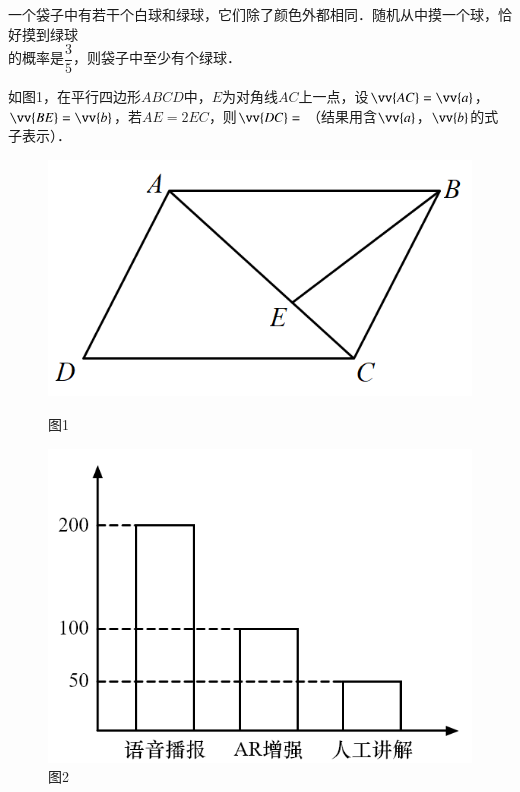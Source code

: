 \documentclass{article}
\begin{document}
\begin{question}[14]
    \item 一个袋子中有若干个白球和绿球，它们除了颜色外都相同．随机从中摸一个球，恰好摸到绿球 \\[5pt]
          的概率是$\dfrac{3}{5}$，则袋子中至少有\blank 个绿球．
\end{question}

\begin{question}[15]
    \item 如图1，在平行四边形$ABCD$中，$E$为对角线$AC$上一点，设$\vv{AC}=\vv{a}$，
          $\vv{BE}=\vv{b}$，若$AE=2EC$，则$\vv{DC}=$\blank
          （结果用含$\vv{a}$，$\vv{b}$的式子表示）．
\end{question}

\begin{figure}[htbp]
    \centering
    \begin{minipage}[b]{.4\linewidth}
        \centering
        \begin{center}
            \includegraphics[scale=0.3]{images/p1.png}
            \caption*{图1}
        \end{center}
    \end{minipage}
    \qquad
    \begin{minipage}[b]{.4\linewidth}
        \centering
        \begin{center}
            \includegraphics[scale=0.3]{images/p2.png}
            \caption*{图2}
        \end{center}
    \end{minipage}
\end{figure}
\end{document}
